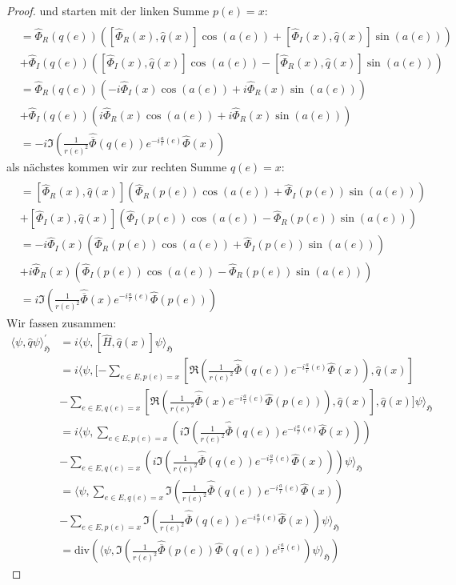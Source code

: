 \documentclass[11pt,a4paper,leqno]{report}
\numberwithin{equation}{chapter}
\begin{document}
\begin{proof}
	und starten mit der linken Summe $p(e)=x$:
	\begin{align*}
		[\Re(\frac{1}{r(e)^2}&\hat{\overline{\Phi}}(q(e))e^{-i\frac{a}{r}(e)}\hat{\Phi}(x)), \hat{q}(x)]\\
		&=\hat{\Phi}_R(q(e))([\hat{\Phi}_R(x), \hat{q}(x)]\cos(a(e)) + [\hat{\Phi}_I(x), \hat{q}(x)]\sin(a(e)))\\
		&+\hat{\Phi}_I(q(e))([\hat{\Phi}_I(x), \hat{q}(x)]\cos(a(e)) - [\hat{\Phi}_R(x), \hat{q}(x)]\sin(a(e)))\\
		&=\hat{\Phi}_R(q(e))(-i\hat{\Phi}_I(x)\cos(a(e)) + i\hat{\Phi}_R(x)\sin(a(e)))\\
		&+\hat{\Phi}_I(q(e))(i\hat{\Phi}_R(x)\cos(a(e)) + i\hat{\Phi}_R(x)\sin(a(e)))\\
		&=-i\Im(\frac{1}{r(e)^2}\hat{\overline{\Phi}}(q(e))e^{-i\frac{a}{r}(e)}\hat{\Phi}(x))
	\end{align*}
	als n\"achstes kommen wir zur rechten Summe $q(e)=x$:
		\begin{align*}
		[\Re(\frac{1}{r(e)^2}&\hat{\overline{\Phi}}(x)e^{-i\frac{a}{r}(e)}\hat{\Phi}(p(e))), \hat{q}(p(e))]\\
		&=[\hat{\Phi}_R(x), \hat{q}(x)](\hat{\Phi}_R(p(e))\cos(a(e)) + \hat{\Phi}_I(p(e))\sin(a(e)))\\
		&+[\hat{\Phi}_I(x), \hat{q}(x)](\hat{\Phi}_I(p(e))\cos(a(e)) - \hat{\Phi}_R(p(e))\sin(a(e)))\\
		&=-i\hat{\Phi}_I(x)(\hat{\Phi}_R(p(e))\cos(a(e)) + \hat{\Phi}_I(p(e))\sin(a(e)))\\
		&+i\hat{\Phi}_R(x)(\hat{\Phi}_I(p(e))\cos(a(e)) - \hat{\Phi}_R(p(e))\sin(a(e)))\\
		&=i\Im(\frac{1}{r(e)^2}\hat{\overline{\Phi}}(x)e^{-i\frac{a}{r}(e)}\hat{\Phi}(p(e)))
	\end{align*}
	Wir fassen zusammen:
	\begin{align*}
		\langle \psi, \hat{q}\psi\rangle_\mathfrak{H}^\prime &=i\langle \psi, [\hat{H},\hat{q}(x)]\psi\rangle_\mathfrak{H} \\&=i\langle \psi, [-\sum_{e\in E, p(e)=x}[\Re(\frac{1}{r(e)^2}\hat{\overline{\Phi}}(q(e))e^{-i\frac{a}{r}(e)}\hat{\Phi}(x)) ,\hat{q}(x)]\\&-
		\sum_{e\in E, q(e)=x}[\Re(\frac{1}{r(e)^2}\hat{\overline{\Phi}}(x)e^{-i\frac{a}{r}(e)}\hat{\Phi}(p(e))) ,\hat{q}(x)]	,\hat{q}(x)]\psi\rangle_\mathfrak{H} \\&
		=i\langle \psi, \sum_{e\in E, p(e)=x}(i\Im(\frac{1}{r(e)^2}\hat{\overline{\Phi}}(q(e))e^{-i\frac{a}{r}(e)}\hat{\Phi}(x)))\\&-
		\sum_{e\in E, q(e)=x}(i\Im(\frac{1}{r(e)^2}\hat{\overline{\Phi}}(q(e))e^{-i\frac{a}{r}(e)}\hat{\Phi}(x)))	\psi\rangle_\mathfrak{H} \\&
		=\langle \psi, \sum_{e\in E, q(e)=x}\Im(\frac{1}{r(e)^2}\hat{\overline{\Phi}}(q(e))e^{-i\frac{a}{r}(e)}\hat{\Phi}(x))
		\\&-\sum_{e\in E, p(e)=x}\Im(\frac{1}{r(e)^2}\hat{\overline{\Phi}}(q(e))e^{-i\frac{a}{r}(e)}\hat{\Phi}(x))\psi\rangle_\mathfrak{H}\\
		&=\text{div}(\langle \psi,\Im(\frac{1}{r(e)^2} \hat{\overline{\Phi}}(p(e))\hat{\Phi}(q(e))e^{i\frac{a}{r}(e)}) \psi\rangle_\mathfrak{H})
	\end{align*}
\end{proof}
\end{document}
